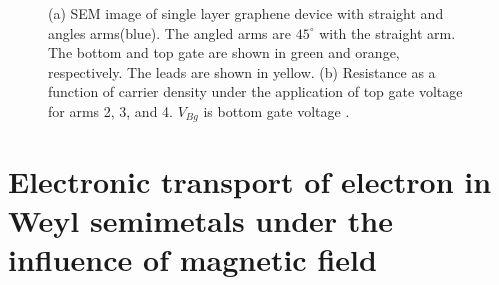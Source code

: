 \begin{figure}[H]
\begin{subfigure}[b]{0.35\linewidth}
            \caption{}
            \label{2fig:r vs v}
        \end{subfigure}
        \caption{(a) SEM image of single layer graphene device with straight and angles arms(blue). 
                    The angled arms are $45^{\circ}$ with the straight arm. 
                    The bottom and top gate are shown in green and orange, respectively. The leads are shown in yellow.
                    (b) Resistance as a function of carrier density under the application of top gate voltage for arms 2, 3, and 4. 
                    $V_{Bg}$ is bottom gate voltage \cite{Rahman2015}.}
        \label{2fig:angle dependent transmission}
    \end{figure}
\section{Electronic transport of electron in Weyl semimetals under the influence of magnetic field} \label{2sec:transport in B field}


